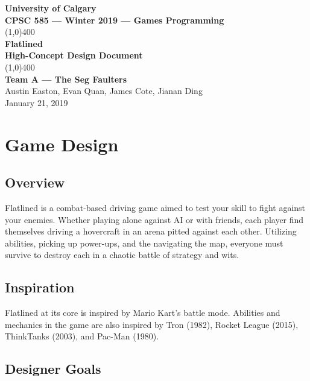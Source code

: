 \documentclass{article}
\newcommand{\name}{Flatlined}
\newcommand{\team}{Team A --- The Seg Faulters}
\theoremstyle{definition}
\begin{document}
\begin{titlepage}
  \begin{center}
    \vspace*{1cm}
    \Large{\textbf{University of Calgary}}\\
    \Large{\textbf{CPSC 585 --- Winter 2019 --- Games Programming}}\\
    \vfill
    \line(1,0){400}\\[1mm]
    \huge{\textbf{\name{}}}\\
    \large{\textbf{High-Concept Design Document}}\\
    \line(1,0){400}\\
    \vfill
    \Large{\textbf{\team{}}}\\
    \Large{Austin Easton, Evan Quan, James Cote, Jianan Ding}\\
    \large{January 21, 2019}
  \end{center}
\end{titlepage}
\setcounter{page}{0}
\tableofcontents
{}
\break{}

\section{Game Design}

\subsection{Overview}

\name{} is a combat-based driving game aimed to test your skill to fight
against your enemies. Whether playing alone against AI or with friends, each
player find themselves driving a hovercraft in an arena pitted against each
other. Utilizing abilities, picking up power-ups, and the navigating the map,
everyone must survive to destroy each in a chaotic battle of strategy and wits.

\subsection{Inspiration}

\name{} at its core is inspired by Mario Kart's battle mode. Abilities and
mechanics in the game are also inspired by Tron (1982), Rocket League (2015),
ThinkTanks (2003), and Pac-Man (1980).

\subsection{Designer Goals} %
\end{document}
